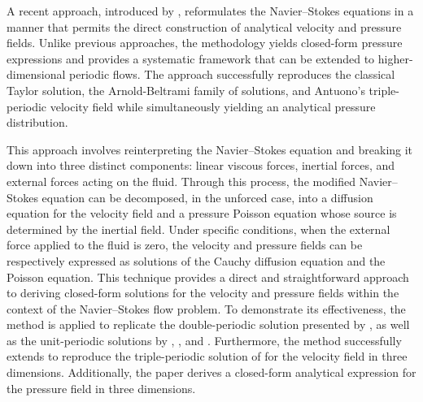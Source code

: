 \documentclass[11pt]{jfm}
\numberwithin{equation}{section}
\begin{document}
\medskip
A recent approach, introduced by \cite{tha4}, reformulates the Navier--Stokes equations in a manner that permits the direct construction of analytical velocity and pressure fields. Unlike previous approaches, the methodology yields closed-form pressure expressions and provides a systematic framework that can be extended to higher-dimensional periodic flows. The approach successfully reproduces the classical Taylor solution, the Arnold-Beltrami family of solutions, and Antuono's triple-periodic velocity field while simultaneously yielding an analytical pressure distribution.

This approach involves reinterpreting the Navier--Stokes equation and breaking it down into three distinct components: linear viscous forces, inertial forces, and external forces acting on the fluid. Through this process, the modified Navier--Stokes equation can be
decomposed, in the unforced case, into a diffusion equation for the velocity field and a pressure
Poisson equation whose source is determined by the inertial field. Under specific conditions, when the external force applied to the fluid is zero, the velocity and pressure fields can be respectively expressed as solutions of the Cauchy diffusion equation and the Poisson equation. This technique provides a direct and straightforward approach to deriving closed-form solutions for the velocity and pressure fields within the context of the Navier--Stokes flow problem. To demonstrate its effectiveness, the method is applied to replicate the double-periodic solution presented by \cite{tay}, as well as the unit-periodic solutions by \cite{arn}, \cite{bab}, and \cite{tha1}. Furthermore, the method successfully extends to reproduce the triple-periodic solution of \cite{ant} for the velocity field in three dimensions. Additionally, the paper derives a closed-form analytical expression for the pressure field in three dimensions.
\end{document}
